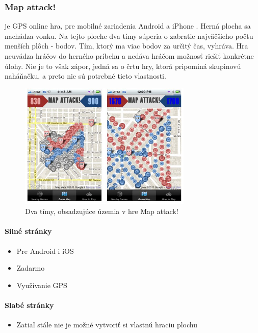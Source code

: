 \subsubsection{Map attack!} je GPS online hra, pre mobilné zariadenia Android a iPhone \cite{mapattack}. Herná plocha sa nachádza vonku. Na tejto ploche dva tímy súperia o zabratie najväčšieho počtu menších plôch - bodov. Tím, ktorý ma viac bodov za určitý čas, vyhráva. Hra neuvádza hráčov do herného príbehu a nedáva hráčom možnosť riešiť konkrétne úlohy. Nie je to však zápor, jedná sa o črtu hry, ktorá pripominá skupinovú naháňačku, a preto nie sú potrebné tieto vlastnosti.
\begin{figure}[h]
  \centering
  \includegraphics[height=6cm]{mainmatter/imgs/mapatack.jpg}
  \caption{Dva tímy, obsadzujúce územia v hre Map attack! }
  \label{fig:mapatack}
\end{figure}

\paragraph*{Silné stránky}
\begin{itemize}
  \item Pre Android i iOS
  \item Zadarmo   
  \item Využívanie GPS
\end{itemize}
\paragraph*{Slabé stránky}
\begin{itemize}
  \item Zatiaľ stále nie je možné vytvoriť si vlastnú hraciu plochu  
\end{itemize}



